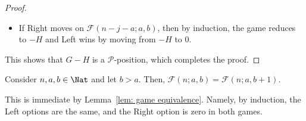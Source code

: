 \documentclass[oneside,reqno]{amsart}
\newcommand{\fs}{\mathcal{F}}
\begin{document}
\begin{proof}
\begin{enumerate}
\begin{itemize}
            \item If Right moves on $\fs(n-j-a;a,b)$, then by induction, the game reduces to $-H$ and Left wins by moving from $-H$ to 0.
        \end{itemize}
    \end{enumerate}This shows that $G-H$ is a $\mathscr{P}$-position, which completes the proof. 
    \fi
\end{proof}

\begin{observation}\label{cor: increasing wealth ineffective}
    Consider $n,a,b\in \Nat$ and let $b>a$. Then, $\fs(n;a,b)=\fs(n;a,b+1)$.  
\end{observation}

This is immediate by Lemma~\ref{lem: game equivalence}. Namely, by induction, the Left options are the same, and the Right option is zero in both games. 
\end{document}
